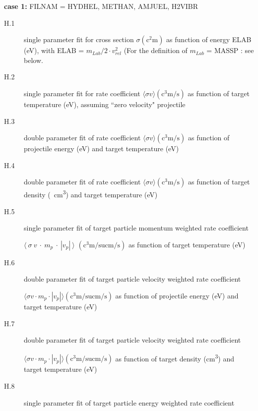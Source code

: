 \begin{description}
        \textbf{case 1:} FILNAM = HYDHEL, METHAN,  AMJUEL, H2VIBR
        \begin{description}
          \item[H.1] single parameter fit for cross section $\sigma
                  (\si{\square\centi\metre})$ as function of energy ELAB (\si{\electronvolt}),
                with ELAB = $m_{Lab} / 2  \cdot  v_{rel}^2 $ (For the definition of $m_{Lab}$ =
                MASSP : see below.
          \item[H.2] single parameter fit for rate coefficient $\langle \sigma v \rangle
                  (\si{\cubic\centi\metre\per\second})$ as function of target temperature
                (\si{\electronvolt}), assuming ``zero velocity" projectile
          \item[H.3] double
                parameter fit of rate coefficient $\langle \sigma v
                  \rangle(\si{\cubic\centi\metre\per\second})$ as function of projectile energy
                (\si{\electronvolt}) and target temperature (\si{\electronvolt})
          \item[H.4]
                double parameter fit of rate coefficient $\langle \sigma v \rangle
                  (\si{\cubic\centi\metre\per\second})$ as function of target density
                (\si{\per\cubic\centi\metre}) and target temperature (\si{\electronvolt})
          \item[H.5] single parameter fit of target particle momentum weighted rate
                coefficient

                $\langle~\sigma~v~\cdot~m_p~\cdot~|v_p|~\rangle$ $
                  (\si{\cubic\centi\metre\per\second\atomicmassunit\centi\metre\per\second})$ as
                function of target temperature (\si{\electronvolt})
          \item[H.6] double parameter
                fit of target particle velocity weighted rate coefficient

                $\langle \sigma v  \cdot  m_p  \cdot  | v_p | \rangle
                  (\si{\cubic\centi\metre\per\second\atomicmassunit\centi\metre\per\second})$ as
                function of projectile energy (\si{\electronvolt}) and target temperature
                (\si{\electronvolt})
          \item[H.7] double parameter fit of target particle
                velocity weighted rate coefficient

                $\langle \sigma v \cdot m_p \cdot | v_p | \rangle
                  (\si{\cubic\centi\metre\per\second\atomicmassunit\centi\metre\per\second})$ as
                function of target density (\si{\cubic\centi\metre}) and target temperature
                (\si{\electronvolt})
          \item[H.8] single parameter fit of target particle energy
                weighted rate coefficient


\end{description}
\end{description}
